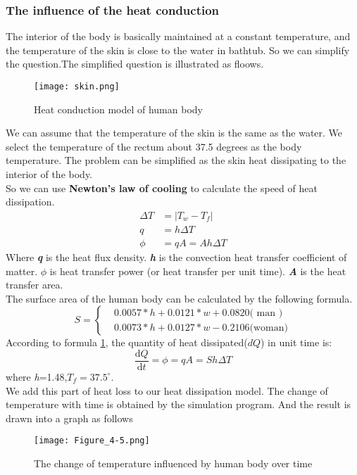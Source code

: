 \documentclass{mcmthesis}
\begin{document}
\subsubsection{The influence of the heat conduction}%
The interior of the body is basically maintained at a constant temperature, and the temperature of the skin is close to the water in bathtub. So we can simplify the question.The simplified question is illustrated as floows.\\

\begin{figure}[H]
\centerline{\texttt{[image: skin.png]}}
\caption{Heat conduction model of human body}
\label{skin}
\end{figure}
\indent We can assume that the temperature of the skin is the same as the water. We select the temperature of the rectum about 37.5 degrees as the body temperature. The problem can be simplified as the skin heat dissipating to the interior of the body.\\
\indent So we can use {\bf Newton's law of cooling} to calculate the speed of heat dissipation.\\
\begin{equation}
\begin{split}
\Delta T&=|T_{w}-T_{f}| \\
q&=h\Delta T	\\
\phi &=qA=Ah\Delta T
\end{split}
\end{equation}
\indent Where \textbf{\emph{q}} is the heat flux density. \textbf{\emph{h}} is the convection heat transfer coefficient of matter. \textbf{\emph{$\phi$}}  is heat transfer power (or heat transfer per unit time). \textbf{\emph{A}} is the heat transfer area.\\
\indent The surface area of the human body can be calculated by the following formula.
\begin{equation}
S= \begin{cases} & 0.0057*h+0.0121*w+0.0820\text{( man )} \\ & 0.0073*h+0.0127*w-0.2106\text{(woman)} \end{cases}
\label{s}
\end{equation}
\indent According to formula \ref{skin}, the quantity of heat dissipated($dQ$) in unit time is:
\begin{equation}
	\frac{\mathrm{d} Q}{\mathrm{d} t}=\phi =qA=Sh\Delta T
	\label{Q_skin}
\end{equation}
where \emph{h}=1.48,${T_{f}}=37.5^{\circ}$. \\
\indent We add this part of heat loss to our heat dissipation model. The change of temperature with time is obtained by the simulation program. And the result is drawn into a graph as follows
\begin{figure}[H]
	\centerline{\texttt{[image: Figure\_4-5.png]}}
	\caption{The change of temperature influenced by human body over time}
	\label{s_person}	
\end{figure}
\end{document}
